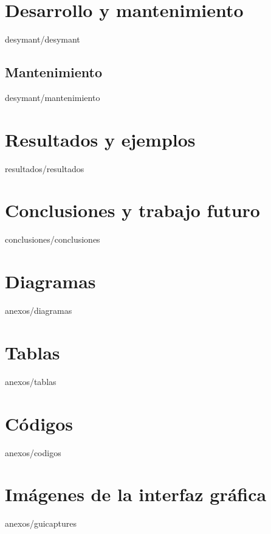 \documentclass[epsbased,copyright,final,printable,covers,extendedindex,firstnumbered,tfg,gnuplot]{tfgtfmthesisuam}
\begin{document}
\chapter{Desarrollo y mantenimiento\label{CAP:DESYMANT}}{desymant/desymant}
	\section{Mantenimiento\label{SEC:MANTENIMIENTO}}{desymant/mantenimiento}
\chapter{Resultados y ejemplos\label{CAP:RESULTADOS}}{resultados/resultados}
\chapter{Conclusiones y trabajo futuro\label{CAP:CONCLUSIONES}}{conclusiones/conclusiones}


\appendix

\chapter{Diagramas\label{CAP:DIAGRAMAS}}{anexos/diagramas}
\chapter{Tablas\label{CAP:TABLAS}}{anexos/tablas}
\chapter{Códigos\label{CAP:CODIGOS}}{anexos/codigos}
\chapter{Imágenes de la interfaz gráfica\label{CAP:GUICAPTURES}}{anexos/guicaptures}
\end{document}
